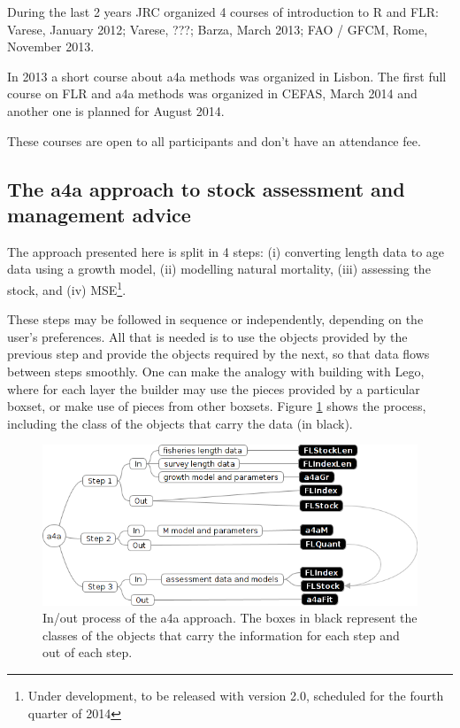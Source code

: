 \documentclass[a4paper,english,10pt]{article}\usepackage[]{graphicx}\usepackage[]{color}
\begin{document}
During the last 2 years JRC organized 4 courses of introduction to R and FLR: Varese, January 2012; Varese, ???; Barza, March 2013; FAO / GFCM, Rome, November 2013.

In 2013 a short course about a4a methods was organized in Lisbon. The first full course on FLR and a4a methods was organized in CEFAS, March 2014 and another one is planned for August 2014.

These courses are open to all participants and don't have an attendance fee.

\subsection{The a4a approach to stock assessment and management advice}

The approach presented here is split in 4 steps: (i) converting length data to age data using a growth model, (ii) modelling natural mortality, (iii) assessing the stock, and (iv) MSE\footnote{Under development, to be released with version 2.0, scheduled for the fourth quarter of 2014}.

These steps may be followed in sequence or independently, depending on the user's preferences. All that is needed is to use the objects provided by the previous step and provide the objects required by the next, so that data flows between steps smoothly. One can make the analogy with building with Lego, where for each layer the builder may use the pieces provided by a particular boxset, or make use of pieces from other boxsets. Figure \ref{fig:inout} shows the process, including the class of the objects that carry the data (in black).

\begin{figure}[h]
\centering
\includegraphics[width=\textwidth]{./inout}
\caption{In/out process of the a4a approach. The boxes in black represent the classes of the objects that carry the information for each step and out of each step.}
\label{fig:inout}
\end{figure}
\end{document}
